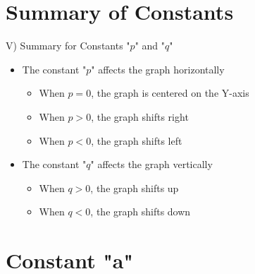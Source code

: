 \documentclass[aspectratio=169]{beamer}
\begin{document}
\section{Summary of Constants}

\begin{frame}{V) Summary for Constants "$p$" and "$q$"}
    \begin{tcolorbox}[colback=lightgray,colframe=primary,title=Key Points]
        \footnotesize
        \begin{itemize}
            \item The constant "$p$" affects the graph horizontally
                \begin{itemize}
                    \item When $p=0$, the graph is centered on the Y-axis
                    \item When $p>0$, the graph shifts right
                    \item When $p<0$, the graph shifts left
                \end{itemize}
            \item The constant "$q$" affects the graph vertically
                \begin{itemize}
                    \item When $q>0$, the graph shifts up
                    \item When $q<0$, the graph shifts down
                \end{itemize}
        \end{itemize}
    \end{tcolorbox}
\end{frame}

\section{Constant "a"}
\end{document}
